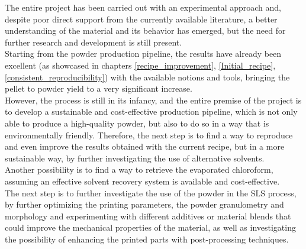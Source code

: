 \documentclass{article}
\begin{document}
    The entire project has been carried out with an experimental approach and, despite poor direct support 
    from the currently available literature, a better understanding of 
    the material and its behavior has emerged, but the need for further research and development is still 
    present. \\ 

    Starting from the powder production pipeline, the results have already been excellent (as showcased in chapters \ref{recipe_improvement}, \ref{Initial_recipe}, 
    \ref{consistent_reproducibility}) with the available notions and tools, bringing the pellet to powder yield to 
    a very significant increase. \\ 

    However, the process is still in its infancy, and the entire premise of the project is to develop a sustainable 
    and cost-effective production pipeline, which is not only able to produce a high-quality powder, but also 
    to do so in a way that is environmentally friendly. Therefore, the next step is to find a way to reproduce and 
    even improve the results obtained with the current recipe, but in a more sustainable way, by further 
    investigating the use of alternative solvents. \\ 

    Another possibility is to find a way to retrieve the evaporated chloroform, assuming an effective solvent recovery 
    system is available and cost-effective. \\ 

    The next step is to further investigate the use of the powder in the SLS process, by further optimizing the 
    printing parameters, the powder granulometry and morphology and experimenting with different additives or material blends that 
    could improve the mechanical properties of the material, as well as investigating the possibility of enhancing the printed parts 
    with post-processing techniques. \\ 


    \clearpage

    \printbibliography
\end{document}
